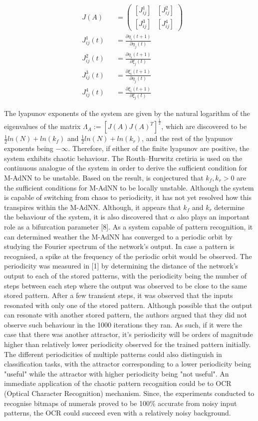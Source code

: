 \documentclass[12pt, letterpaper]{article}
\begin{document}
$$
\begin{aligned}
& J(A) &&= \begin{pmatrix}
  [J_{ij}^1] & [J_{ij}^2]\\
  [J_{ij}^3] & [J_{ij}^4]
  \end{pmatrix}\\
& J_{ij}^1(t) &&= \frac{\partial \eta_i(t+1)}{\partial \eta_j(t)}\\
& J_{ij}^2(t) &&= \frac{\partial \eta_i(t+1)}{\partial \xi_j(t)}\\
& J_{ij}^3(t) &&= \frac{\partial \xi_i(t+1)}{\partial \eta_j(t)}\\
& J_{ij}^4(t) &&= \frac{\partial \xi_i(t+1)}{\partial \xi_j(t)}
\end{aligned}
$$


The lyapunov exponents of the system are given by the natural logarithm of the eigenvalues of the matrix $\Lambda_A := [J(A)J(A)^T]^{\frac{1}{2}}$, which are discovered to be ${\frac{1}{2}}ln(N) + ln(k_f)$ and ${\frac{1}{2}}ln(N) + ln(k_r)$, and the rest of the lyapunov exponents being $-\infty$. Therefore, if either of the finite lyapunov are positive, the system exhibits chaotic behaviour. The Routh–Hurwitz cretiria is used on the continuous analogue of the system in order to derive the sufficient condition for M-AdNN to be unstable. Based on the result, is conjectured that $k_f, k_r > 0$ are the sufficient conditions for M-AdNN to be locally unstable. Although the system is capable of switching from chaos to periodicity, it has not yet resolved how this transpires within the M-AdNN. Although, it appears that $k_f$ and $k_r$ determine the behaviour of the system, it is also discovered that $\alpha$ also plays an important role as a bifurcation parameter [8]. As a system capable of pattern recognition, it can determined weather the M-AdNN has converged to a periodic orbit by studying the Fourier spectrum of the network's output. In case a pattern is recognised, a spike at the frequency of the periodic orbit would be observed. The periodicity was measured in [1] by determining the distance of the network's output to each of the stored patterns, with the periodicity being the number of steps between each step where the output was observed to be close to the same stored pattern. After a few transient steps, it was observed that the inputs resonated with only one of the stored pattern. Although possible that the output can resonate with another stored pattern, the authors argued that they did not observe such behaviour in the 1000 iterations they ran. As such, if it were the case that there was another attractor, it's periodicity will be orders of magnitude higher than relatively lower periodicity observed for the trained pattern initially. The different periodicities of multiple patterns could also distinguish in classification tasks, with the attractor corresponding to a lower periodicity being "useful" while the attractor with higher periodicity being "not useful". An immediate application of the chaotic pattern recognition could be to OCR (Optical Character Recognition) mechanism. Since, the experiments conducted to recognise bitmaps of numerals proved to be 100\% accurate from noisy input patterns, the OCR could succeed even with a relatively noisy background.
\end{document}

